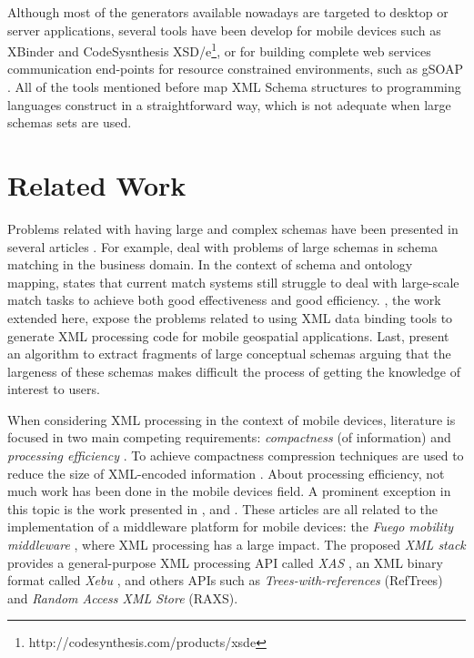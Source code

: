 \documentclass{sig-alternate}
\begin{document}
\begin{sloppypar}
Although most of the generators available nowadays are targeted to desktop or server applications, several tools have been develop for mobile devices such as XBinder and CodeSysnthesis XSD/e\footnote{http://codesynthesis.com/products/xsde}, or for building complete web services communication end-points for resource constrained environments, such as gSOAP \cite{proc:vanengelen}. All of the tools mentioned before map XML Schema structures to programming languages construct in a straightforward way, which is not adequate when large schemas sets are used.
\end{sloppypar}


\section{Related Work}

\begin{sloppypar}
Problems related with having large and complex schemas have been presented in several articles \cite{proc:pichler, coll:rahm, proc:tamayo4,  proc:villegas}. 
For example, \cite{proc:pichler} deal with problems of large schemas in schema matching in the business domain. 
In the context of schema and ontology mapping, \cite{coll:rahm} states that current match systems still struggle to deal with large-scale match tasks to achieve both good effectiveness and good efficiency.
\cite{proc:tamayo4}, the work extended here, expose the problems related to using XML data binding tools to generate XML processing code for mobile geospatial applications.
Last, \cite{proc:villegas} present an algorithm to extract fragments of large conceptual schemas arguing that the largeness of these schemas makes difficult the process of getting the knowledge of interest to users.   
\end{sloppypar}


When considering XML processing in the context of mobile devices, literature is focused in two main competing requirements: \textit{compactness} (of information) and \textit{processing efficiency} \cite{article:kangasharju1}. 
To achieve compactness compression techniques are used to reduce the size of XML-encoded information \cite{proc:kabisch, proc:kangasharju2, w3c:exi}. 
About processing efficiency, not much work has been done in the mobile devices field. 
A prominent exception in this topic is the work presented in \cite{article:kangasharju1}, \cite{proc:kangasharju2} and \cite{proc:lindholm}. 
These articles are all related to the implementation of a middleware platform for mobile devices: the \textit{Fuego mobility middleware} \cite{proc:tarkoma}, where XML processing has a large impact. 
The proposed \textit{XML stack} provides a general-purpose XML processing API called \textit{XAS} \cite{article:kangasharju1}, an XML binary format called \textit{Xebu} \cite{proc:kangasharju2}, and others APIs such as \textit{Trees-with-references} (RefTrees) and \textit{Random Access XML Store} (RAXS)\cite{proc:lindholm}. 
\end{document}
